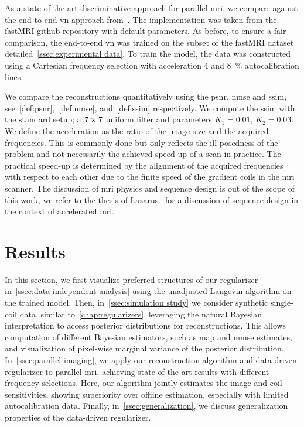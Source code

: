 As a state-of-the-art discriminative approach for parallel \gls{mri}, we compare against the end-to-end \gls{vn} approach from~\cite{sriram_endtoend_2020}.
The implementation was taken from the fastMRI github repository with default parameters.
As before, to ensure a fair comparison, the end-to-end \gls{vn} was trained on the subset of the fastMRI dataset detailed~\cref{ssec:experimental data}.
To train the model, the data was constructed using a Cartesian frequency selection with acceleration \num{4} and \qty{8}{\percent} autocalibration lines.

We compare the reconstructions quantitatively using the \gls{psnr}, \gls{nmse} and \gls{ssim}, see~\cref{def:psnr},~\cref{def:nmse}, and~\cref{def:ssim} respectively.
We compute the \gls{ssim} with the standard setup;
a \( \numproduct{7x7} \) uniform filter and parameters \( K_{\num{1}} = \num{0.01} \), \( K_{\num{2}} = \num{0.03} \).
We define the acceleration as the ratio of the image size and the acquired frequencies.
This is commonly done but only reflects the ill-posedness of the problem and not necessarily the achieved speed-up of a scan in practice.
The practical speed-up is determined by the alignment of the acquired frequencies with respect to each other due to the finite speed of the gradient coils in the \gls{mri} scanner.
The discussion of \gls{mri} physics and sequence design is out of the scope of this work, we refer to the thesis of Lazarus~\cite{lazarus_compressed_2018} for a discussion of sequence design in the context of accelerated \gls{mri}.
\section{Results}
\label{sec:results deep neural regularizer}
In this section, we first visualize preferred structures of our regularizer in~\cref{ssec:data independent analysis} using the unadjusted Langevin algorithm on the trained model.
Then, in~\cref{ssec:simulation study} we consider synthetic single-coil data, similar to~\cref{chap:regularizers}, leveraging the natural Bayesian interpretation to access posterior distributions for reconstructions.
This allows computation of different Bayesian estimators, such as \gls{map} and \gls{mmse} estimates, and visualization of pixel-wise marginal variance of the posterior distribution.
In~\cref{ssec:parallel imaging}, we apply our reconstruction algorithm and data-driven regularizer to parallel \gls{mri}, achieving state-of-the-art results with different frequency selections.
Here, our algorithm jointly estimates the image and coil sensitivities, showing superiority over offline estimation, especially with limited autocalibration data.
Finally, in~\cref{ssec:generalization}, we discuss generalization properties of the data-driven regularizer.
